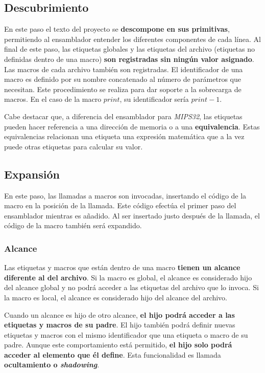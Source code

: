 \subsection{Descubrimiento}\label{subsec:descubrimiento}

En este paso el texto del proyecto se \textbf{descompone en sus primitivas},
permitiendo al ensamblador entender los diferentes componentes de cada línea.
Al final de este paso, las etiquetas globales y las etiquetas del archivo
(etiquetas no definidas dentro de una macro) \textbf{son registradas sin
ningún valor asignado}.
Las macros de cada archivo también son registradas.
El identificador de una macro es definido por su nombre concatenado
al número de parámetros que necesitan.
Este procedimiento se realiza para dar soporte a la sobrecarga de macros.
En el caso de la macro $print$, su identificador sería
$print-1$.

Cabe destacar que, a diferencia del ensamblador para \textit{MIPS32},
las etiquetas pueden hacer referencia a una dirección de memoria
o a una \textbf{equivalencia}.
Estas equivalencias relacionan una etiqueta  una expresión matemática
que a la vez puede  otras etiquetas para calcular su valor.

\subsection{Expansión}\label{subsec:expansion}

En este paso, las llamadas a macros son invocadas,
insertando el código de la macro en la posición de la llamada.
Este código efectúa el primer paso del ensamblador mientras es añadido.
Al ser insertado justo después de la llamada, el código de la macro
también será expandido.

\subsubsection{Alcance}\label{subsubsec:alcance}

Las etiquetas y macros que están dentro de una macro
\textbf{tienen un alcance diferente al del archivo}.
Si la macro es global, el alcance es considerado hijo del alcance global
y no podrá acceder a las etiquetas del archivo que lo invoca.
Si la macro es local, el alcance es considerado hijo del alcance del archivo.

Cuando un alcance es hijo de otro alcance,
\textbf{el hijo podrá acceder a las etiquetas y macros de su padre}.
El hijo también podrá definir nuevas etiquetas y macros con el mismo
identificador que una etiqueta o macro de su padre.
Aunque este comportamiento está permitido, \textbf{el hijo solo podrá acceder
al elemento que él define}.
Esta funcionalidad es llamada \textbf{ocultamiento o \textit{shadowing}}.

